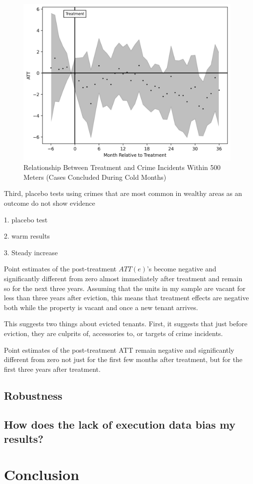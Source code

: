 \documentclass[12pt]{article}
\begin{document}
       \begin{figure}[H]
        \centering
        \includegraphics{output/group_0_crimes_cold_500m/figures/att_gt_dr_event_study_long_horizon.png}
        \caption{Relationship Between Treatment and Crime Incidents Within 500 Meters (Cases Concluded During Cold Months)}
        \label{fig:my_label}
    \end{figure}

    

    Third, placebo tests using \<crimes that are most common in wealthy areas\> as an outcome do not show evidence 

    1. placebo test

    2. warm results

    3. Steady increase 
    
    
    Point estimates of the post-treatment $ATT(e)$'s become negative and significantly different from zero almost immediately after treatment and remain so for the next three years. Assuming that the units in my sample are vacant for less than three years after eviction, this means that treatment effects are negative both while the property is vacant and once a new tenant arrives. 
    
    
    This suggests two things about evicted tenants. First, it suggests that just before eviction, they are culprits of, accessories to, or targets of crime incidents. 
    
    Point estimates of the post-treatment ATT remain negative and significantly different from zero not just for the first few months after treatment, but for the first three years after treatment. 

    \subsection{Robustness}
    \subsection{How does the lack of execution data bias my results?}

    


\section{Conclusion} \label{sec:conclusion}





\clearpage

\onehalfspacing

%
\end{document}
